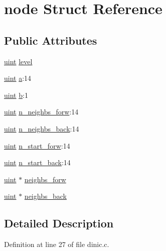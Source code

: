 \hypertarget{structnode}{
\section{node Struct Reference}
\label{structnode}
}
\subsection*{Public Attributes}
\begin{DoxyCompactItemize}
\item 
\hyperlink{dinic_8c_a91ad9478d81a7aaf2593e8d9c3d06a14}{uint} \hyperlink{structnode_a36646eb4400739b7f55f75d9234d50b3}{level}
\item 
\hyperlink{dinic_8c_a91ad9478d81a7aaf2593e8d9c3d06a14}{uint} \hyperlink{structnode_ab3ebb77648e3179638a796c91cf35050}{a}:14
\item 
\hyperlink{dinic_8c_a91ad9478d81a7aaf2593e8d9c3d06a14}{uint} \hyperlink{structnode_a47676bd29ce98f47afc8beb738eaa395}{b}:1
\item 
\hyperlink{dinic_8c_a91ad9478d81a7aaf2593e8d9c3d06a14}{uint} \hyperlink{structnode_ad0b9f01f833dc473ce11a6849bce3bc6}{n\_\-neighbs\_\-forw}:14
\item 
\hyperlink{dinic_8c_a91ad9478d81a7aaf2593e8d9c3d06a14}{uint} \hyperlink{structnode_a96601323c6655323e55cafd93415110a}{n\_\-neighbs\_\-back}:14
\item 
\hyperlink{dinic_8c_a91ad9478d81a7aaf2593e8d9c3d06a14}{uint} \hyperlink{structnode_a4f82e79344d9435319b2da13f66dde73}{n\_\-start\_\-forw}:14
\item 
\hyperlink{dinic_8c_a91ad9478d81a7aaf2593e8d9c3d06a14}{uint} \hyperlink{structnode_a0d05080c7ed6c9265f75426294941b4f}{n\_\-start\_\-back}:14
\item 
\hyperlink{dinic_8c_a91ad9478d81a7aaf2593e8d9c3d06a14}{uint} $\ast$ \hyperlink{structnode_a9705979b163af6980b8817b4ef76c0f5}{neighbs\_\-forw}
\item 
\hyperlink{dinic_8c_a91ad9478d81a7aaf2593e8d9c3d06a14}{uint} $\ast$ \hyperlink{structnode_a6d63f0f69b6b280e46a3f22bbc7a974f}{neighbs\_\-back}
\end{DoxyCompactItemize}


\subsection{Detailed Description}


Definition at line 27 of file dinic.c.



